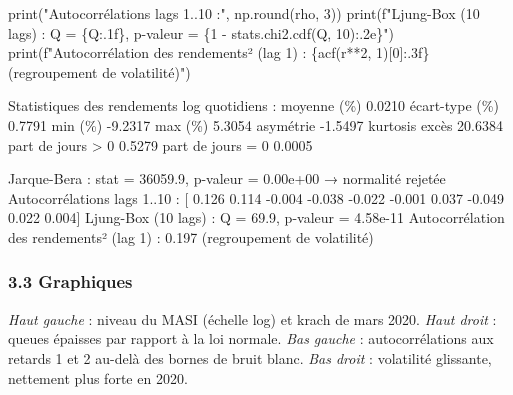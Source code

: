 \documentclass[
  10pt,
]{article}
\newenvironment{Shaded}{}{}
\newcommand{\BuiltInTok}[1]{\textcolor[rgb]{0.00,0.50,0.00}{#1}}
\newcommand{\DecValTok}[1]{\textcolor[rgb]{0.25,0.63,0.44}{#1}}
\newcommand{\NormalTok}[1]{#1}
\newcommand{\OperatorTok}[1]{\textcolor[rgb]{0.40,0.40,0.40}{#1}}
\newcommand{\SpecialCharTok}[1]{\textcolor[rgb]{0.25,0.44,0.63}{#1}}
\newcommand{\SpecialStringTok}[1]{\textcolor[rgb]{0.73,0.40,0.53}{#1}}
\newcommand{\StringTok}[1]{\textcolor[rgb]{0.25,0.44,0.63}{#1}}
\begin{document}
\begin{Shaded}
\begin{Highlighting}[]
\BuiltInTok{print}\NormalTok{(}\StringTok{"Autocorrélations lags 1..10 :"}\NormalTok{, np.}\BuiltInTok{round}\NormalTok{(rho, }\DecValTok{3}\NormalTok{))}
\BuiltInTok{print}\NormalTok{(}\SpecialStringTok{f"Ljung{-}Box (10 lags) : Q = }\SpecialCharTok{\{}\NormalTok{Q}\SpecialCharTok{:.1f\}}\SpecialStringTok{, p{-}valeur = }\SpecialCharTok{\{}\DecValTok{1} \OperatorTok{{-}}\NormalTok{ stats}\SpecialCharTok{.}\NormalTok{chi2}\SpecialCharTok{.}\NormalTok{cdf(Q, }\DecValTok{10}\NormalTok{)}\SpecialCharTok{:.2e\}}\SpecialStringTok{"}\NormalTok{)}
\BuiltInTok{print}\NormalTok{(}\SpecialStringTok{f"Autocorrélation des rendements² (lag 1) : }\SpecialCharTok{\{}\NormalTok{acf(r}\OperatorTok{**}\DecValTok{2}\NormalTok{, }\DecValTok{1}\NormalTok{)[}\DecValTok{0}\NormalTok{]}\SpecialCharTok{:.3f\}}\SpecialStringTok{  (regroupement de volatilité)"}\NormalTok{)}
\end{Highlighting}
\end{Shaded}

\begin{Shaded}
\begin{Highlighting}[]
\NormalTok{Statistiques des rendements log quotidiens :}
\NormalTok{moyenne (\%)           0.0210}
\NormalTok{écart{-}type (\%)        0.7791}
\NormalTok{min (\%)              {-}9.2317}
\NormalTok{max (\%)               5.3054}
\NormalTok{asymétrie            {-}1.5497}
\NormalTok{kurtosis excès       20.6384}
\NormalTok{part de jours \textgreater{} 0     0.5279}
\NormalTok{part de jours = 0     0.0005}

\NormalTok{Jarque{-}Bera : stat = 36059.9, p{-}valeur = 0.00e+00  → normalité rejetée}
\NormalTok{Autocorrélations lags 1..10 : [ 0.126  0.114 {-}0.004 {-}0.038 {-}0.022 {-}0.001  0.037 {-}0.049  0.022  0.004]}
\NormalTok{Ljung{-}Box (10 lags) : Q = 69.9, p{-}valeur = 4.58e{-}11}
\NormalTok{Autocorrélation des rendements² (lag 1) : 0.197  (regroupement de volatilité)}
\end{Highlighting}
\end{Shaded}

\hypertarget{graphiques}{%
\subsubsection{3.3 Graphiques}\label{graphiques}}

\emph{Haut gauche} : niveau du MASI (échelle log) et krach de mars 2020.
\emph{Haut droit} : queues épaisses par rapport à la loi normale.
\emph{Bas gauche} : autocorrélations aux retards 1 et 2 au-delà des
bornes de bruit blanc. \emph{Bas droit} : volatilité glissante,
nettement plus forte en 2020.
\end{document}
